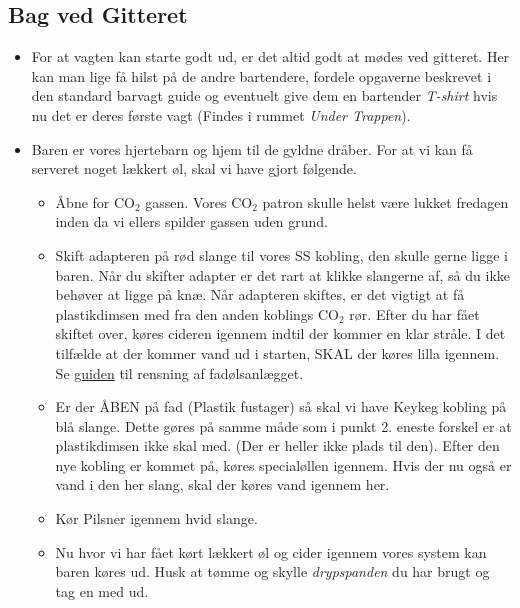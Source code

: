 \subsection{Bag ved Gitteret}
\label{sec:pre:bag-ved-gitteret}
\begin{itemize}
    \item For at vagten kan starte godt ud, er det altid godt at mødes ved gitteret. 
    Her kan man lige få hilst på de andre bartendere, fordele opgaverne beskrevet i den standard 
    barvagt guide og eventuelt give dem en bartender \textit{T-shirt} hvis nu det er deres første vagt 
    (Findes i rummet \textit{Under Trappen}). 
    \item Baren er vores hjertebarn og hjem til de gyldne dråber. 
    For at vi kan få serveret noget lækkert øl, skal vi have gjort følgende.  
    \begin{itemize}
        \item Åbne for CO$_2$ gassen. Vores CO$_2$ patron skulle helst være lukket fredagen 
        inden da vi ellers spilder gassen uden grund.
        \item Skift adapteren på rød slange til vores SS kobling, den skulle gerne ligge i baren. 
        Når du skifter adapter er det rart at klikke slangerne af, så du ikke behøver at ligge på knæ. 
        Når adapteren skiftes, er det vigtigt at få plastikdimsen med fra den anden koblings CO$_2$ rør. 
        Efter du har fået skiftet over, køres cideren igennem indtil der kommer en klar stråle. 
        I det tilfælde at der kommer vand ud i starten, SKAL der køres lilla igennem. 
        Se \href{https://media.fredagscafeen.dk/guides/rensningafanlaeg.pdf}{guiden} til rensning af fadølsanlægget. 
        \item Er der ÅBEN på fad (Plastik fustager) så skal vi have Keykeg kobling på blå slange. 
        Dette gøres på samme måde som i punkt 2. eneste forskel er at plastikdimsen ikke skal med. 
        (Der er heller ikke plads til den). 
        Efter den nye kobling er kommet på, køres specialøllen igennem. 
        Hvis der nu også er vand i den her slang, skal der køres vand igennem her. 
        \item Kør Pilsner igennem hvid slange. 
        \item Nu hvor vi har fået kørt lækkert øl og cider igennem vores system kan baren køres ud. 
        Husk at tømme og skylle \textit{drypspanden} du har brugt og tag en med ud. 
    \end{itemize}
\end{itemize}

